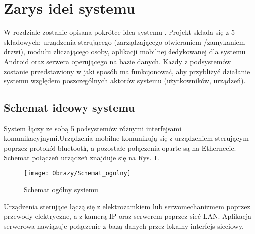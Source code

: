 % 
\newpage\section{Zarys idei systemu \textsl{\NazwaSys}}\label{sec:ideasystemu}
W rozdziale zostanie opisana pokrótce idea systemu \NazwaSys. Projekt składa się z 5 składowych: urządzenia sterującego (zarządzającego otwieraniem /zamykaniem drzwi), modułu zliczającego osoby, aplikacji mobilnej dedykowanej dla systemu Android oraz serwera operującego na bazie danych. Każdy z podsystemów zostanie przedstawiony w jaki sposób ma funkcjonować, aby przybliżyć działanie systemu względem poszczególnych aktorów systemu (użytkowników, urządzeń).

\subsection{Schemat ideowy systemu \textsl{\NazwaSys}}
System łączy ze sobą 5 podsystemów różnymi interfejsami komunikacyjnymi.Urządzenia mobilne komunikują się z urządzeniem sterującym poprzez protokół bluetooth, a pozostałe połączenia oparte są na Ethernecie. Schemat połączeń urządzeń znajduje się na Rys. \ref{Schemat ogólny systemu}.

\begin{figure}[!h]
	\centering
	\texttt{[image: Obrazy/Schemat\_ogolny]}
	\caption{Schemat ogólny systemu}
	\label{Schemat ogólny systemu}
\end{figure}

Urządzenia sterujące łączą się z elektrozamkiem lub serwomechanizmem poprzez przewody elektryczne, a z kamerą IP oraz serwerem poprzez sieć LAN. Aplikacja serwerowa nawiązuje połączenie z bazą danych przez lokalny interfejs sieciowy.

\newpage
